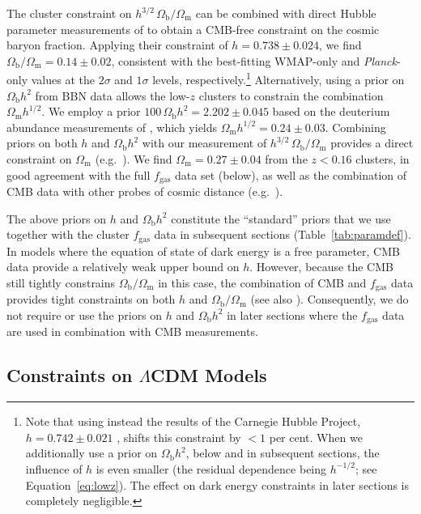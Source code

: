 \documentclass[useAMS,usenatbib,usegraphicx]{mn2e}
\newcommand*{\mysub}[2]{\ensuremath{#1_{\mathrm{#2}}}}
\newcommand*{\Omegam}{\mysub{\Omega}{m}}
\newcommand*{\Omegab}{\mysub{\Omega}{b}}
\newcommand*{\fgas}{\mysub{f}{gas}}
\newcommand*{\LCDM}{\ensuremath{\Lambda}CDM}
\newcommand*{\eqnref}{Equation}
\newcommand*{\tabref}{Table}
\newcommand*{\Planck}{{\it Planck}}
\newcommand*{\arsemf}{\citetalias{Allen0706.0033}}
\begin{document}
The cluster constraint on $h^{3/2}\,\Omegab/\Omegam$ can be combined with direct Hubble parameter measurements of \citet{Riess1103.2976} to obtain a CMB-free constraint on the cosmic baryon fraction. Applying their constraint of $h=0.738\pm0.024$, we find $\Omegab/\Omegam=0.14\pm0.02$, consistent with the best-fitting WMAP-only and \Planck{}-only values at the $2\sigma$ and $1\sigma$ levels, respectively.\footnote{Note that using instead the results of the Carnegie Hubble Project, $h=0.742\pm0.021$ \citep{Freedman1208.3281}, shifts this constraint by $<1$ per cent. When we additionally use a prior on $\Omegab h^2$, below and in subsequent sections, the influence of $h$ is even smaller (the residual dependence being $h^{-1/2}$; see \eqnref~\ref{eq:lowz}). The effect on dark energy constraints in later sections is completely negligible.} Alternatively, using a prior on $\Omegab h^2$ from BBN data allows the low-$z$ clusters to constrain the combination $\Omegam h^{1/2}$. We employ a prior $100\,\Omegab h^2=2.202\pm0.045$ based on the deuterium abundance measurements of \citet{Cooke1308.3240}, which yields $\Omegam h^{1/2}=0.24\pm0.03$. Combining priors on both $h$ and $\Omegab h^2$ with our measurement of $h^{3/2}\,\Omegab/\Omegam$  provides a direct constraint on \Omegam{} (e.g.\ \citealt{White1993Natur.366..429W}). We find $\Omegam=0.27\pm0.04$ from the $z<0.16$ clusters, in good agreement with the full \fgas{} data set (below), as well as the combination of CMB data with other probes of cosmic distance (e.g.\ \citealt{Hinshaw1212.5226, Planck1303.5076}).

The above priors on $h$ and $\Omegab h^2$ constitute the ``standard'' priors that we use together with the cluster \fgas{} data in subsequent sections (\tabref~\ref{tab:paramdef}).
In models where the equation of state of dark energy is a free parameter, CMB data provide a relatively weak upper bound on $h$. However, because the CMB still tightly constrains $\Omegab/\Omegam$ in this case, the combination of CMB and \fgas{} data provides tight constraints on both $h$ and $\Omegab/\Omegam$ (see also \arsemf). Consequently, we do not require or use the priors on $h$ and $\Omegab h^2$ in later sections where the \fgas{} data are used in combination with CMB measurements.

\subsection{Constraints on \LCDM{} Models}
\end{document}
